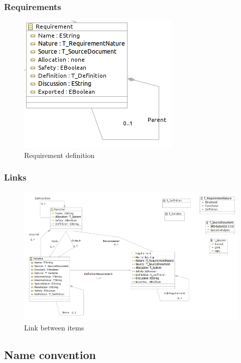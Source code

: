 \subsubsection{Requirements}


\begin{figure}[ht]
  \centering
  \includegraphics{DataModel/Requirement.png}
  \caption{Requirement definition}
  \label{fig:requirement}
\end{figure}

\subsubsection{Links}


\begin{figure}[ht]
  \centering
  \includegraphics[width=\textwidth]{DataModel/DataModel.png}
  \caption{Link between items}
  \label{fig:links}
\end{figure}

\subsection{Name convention}


